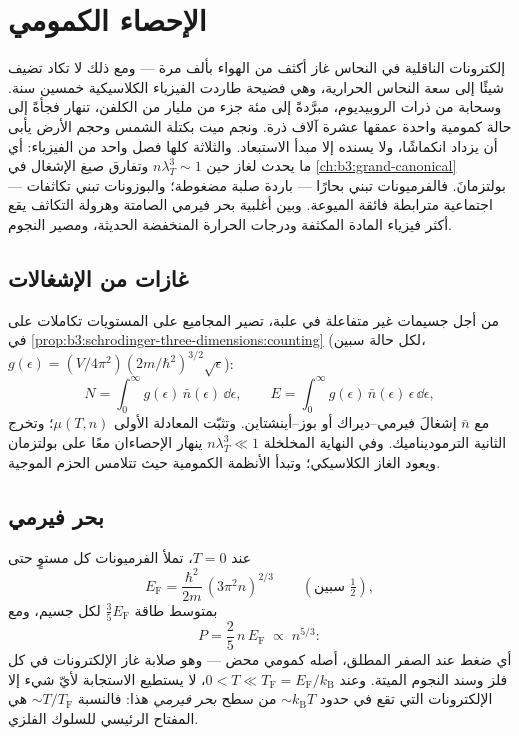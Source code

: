 \chapter{الإحصاء الكمومي}\label{ch:b3:quantum-statistics}

إلكترونات الناقلية في النحاس غاز أكثف من الهواء بألف
مرة --- ومع ذلك لا تكاد تضيف شيئًا إلى سعة النحاس الحرارية، وهي
فضيحة طاردت الفيزياء الكلاسيكية خمسين سنة. وسحابة من
ذرات الروبيديوم، مبرَّدةً إلى مئة جزء من مليار من الكلفن،
تنهار فجأةً إلى حالة كمومية واحدة عمقها عشرة آلاف
ذرة. ونجم ميت بكتلة الشمس وحجم الأرض
يأبى أن يزداد انكماشًا، ولا يسنده إلا مبدأ
الاستبعاد. والثلاثة كلها فصل واحد من الفيزياء: أي ما يحدث
لغاز حين $n\lambda_T^3 \sim 1$ وتفارق صيغ الإشغال في
\cref{ch:b3:grand-canonical} بولتزمانَ. فالفرميونات تبني
بحارًا --- باردة صلبة مضغوطة؛ والبوزونات تبني تكاثفات ---
اجتماعية مترابطة فائقة الميوعة. وبين أغلبية بحر فيرمي الصامتة
وهرولة التكاثف يقع أكثر فيزياء المادة المكثفة
ودرجات الحرارة المنخفضة الحديثة، ومصير
النجوم.

\section{غازات من الإشغالات}

\begin{proposition}\label{prop:b3:quantum-statistics:machinery}
من أجل جسيمات غير متفاعلة في علبة، تصير المجاميع على المستويات
تكاملات على  في
\cref{prop:b3:schrodinger-three-dimensions:counting} (لكل حالة
سبين، $g(\epsilon) = (V/4\pi^2)(2m/\hbar^2)^{3/2}\sqrt\epsilon$):
\[
N = \int_0^\infty g(\epsilon)\,\bar n(\epsilon)\,\dd\epsilon ,
\qquad
E = \int_0^\infty g(\epsilon)\,\bar n(\epsilon)\,\epsilon\,
\dd\epsilon ,
\]
مع $\bar n$ إشغالَ فيرمي--ديراك أو بوز--أينشتاين. وتثبّت
المعادلة الأولى $\mu(T, n)$؛ وتخرج الثانية
الترموديناميك. وفي النهاية المخلخلة $n\lambda_T^3 \ll 1$ ينهار
الإحصاءان معًا على بولتزمان ويعود الغاز الكلاسيكي؛
وتبدأ الأنظمة الكمومية حيث تتلامس الحزم الموجية.
\end{proposition}
\admitted

\section{بحر فيرمي}

\begin{theorem}\label{thm:b3:quantum-statistics:fermi}
عند $T = 0$، تملأ الفرميونات كل مستوٍ حتى \emph{}
\[
E_{\text{F}} = \frac{\hbar^2}{2m}\,(3\pi^2n)^{2/3}
\qquad (\text{سبين } \tfrac12) ,
\]
بمتوسط طاقة $\tfrac35 E_{\text{F}}$ لكل جسيم، ومع \emph{}
\[
P = \frac25\,n\,E_{\text{F}} \;\propto\; n^{5/3} :
\]
أي ضغط عند الصفر المطلق، أصله كمومي محض --- وهو
صلابة غاز الإلكترونات في كل فلز وسند النجوم
الميتة. وعند $0 < T \ll T_{\text{F}} = E_{\text{F}}/k_{\text{B}}$،
لا يستطيع الاستجابة لأيّ شيء إلا الإلكترونات التي تقع في حدود
$\sim k_{\text{B}}T$ من سطح \emph{بحر فيرمي} هذا: فالنسبة
$\sim T/T_{\text{F}}$ هي المفتاح الرئيسي للسلوك الفلزي.
\end{theorem}

